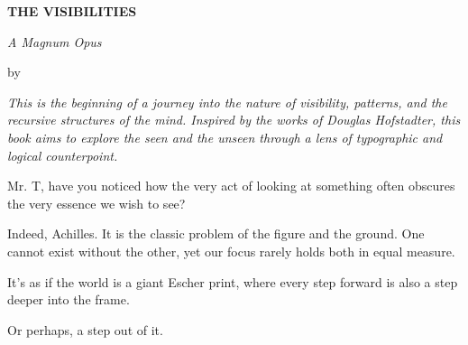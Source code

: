 

\centerline{\typosize[20/24]\bf THE VISIBILITIES}
\smallskip
\centerline{\typosize[14/17]\it A Magnum Opus}
\bigskip
\centerline{by}
\bigskip
\centerline{\typosize[16/20]} %

\vfill
\eject


\it This is the beginning of a journey into the nature of visibility, patterns, and the recursive structures of the mind. Inspired by the works of Douglas Hofstadter, this book aims to explore the seen and the unseen through a lens of typographic and logical counterpoint.
\rm

\separator

\achilles Mr. T, have you noticed how the very act of looking at something often obscures the very essence we wish to see?

\tortoise Indeed, Achilles. It is the classic problem of the figure and the ground. One cannot exist without the other, yet our focus rarely holds both in equal measure.

\achilles It's as if the world is a giant Escher print, where every step forward is also a step deeper into the frame.

\tortoise Or perhaps, a step out of it.

\bye
